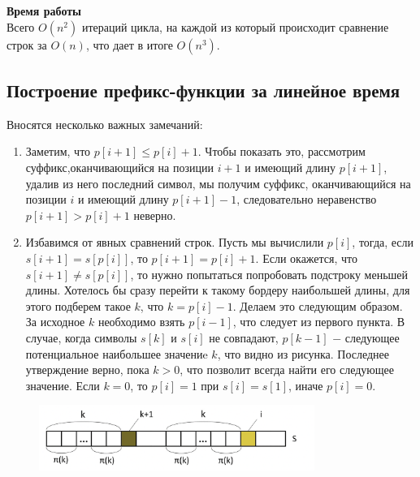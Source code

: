         \textbf{Время работы}\\
        Всего $O(n^2)$ итераций цикла, на каждой из который происходит сравнение строк за $O(n)$, что дает в итоге $O(n^3)$.
    
    \subsection{Построение префикс-функции за линейное время}
        Вносятся несколько важных замечаний:
        \begin{enumerate}[label=$\ast$]
            \item Заметим, что $p[i+1] \leq p[i] + 1$. Чтобы показать это, рассмотрим суффикс,оканчивающийся на позиции $i+1$  и имеющий длину $p[i+1]$, удалив из него последний символ, мы получим суффикс, оканчивающийся на позиции $i$ и имеющий длину $p[i+1] - 1$, следовательно неравенство $p[i+1] > p[i] + 1$ неверно.
            \item Избавимся от явных сравнений строк. Пусть мы вычислили $p[i]$, тогда, если $s[i+1] = s[p[i]]$, то $p[i+1] = p[i] + 1$.  Если окажется, что $s[i+1] \neq s[p[i]]$, то нужно попытаться попробовать подстроку меньшей длины. Хотелось бы сразу перейти к такому бордеру наибольшей длины, для этого подберем такое $k$, что $k = p[i] - 1$. Делаем это следующим образом. За исходное $k$ необходимо взять $p[i-1]$, что следует из первого пункта. В случае, когда символы $s[k]$ и $s[i]$ не совпадают, $p[k-1]$ $-$  следующее потенциальное наибольшее значениe $k$, что видно из рисунка. Последнее утверждение верно, пока $k > 0$, что позволит всегда найти его следующее значение. Если $k = 0$, то $p[i] = 1$ при $s[i] = s[1]$, иначе $p[i] = 0$.
        \end{enumerate}

        \begin{figure}[H]
                \centering
                \includegraphics[width=0.8\textwidth]{images/chapter6/better_prefix_func.png}
                \label{fig:images/chapter6/better_prefix_func.png}
        \end{figure}

